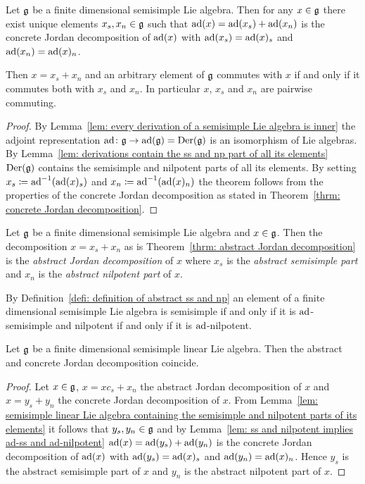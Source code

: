 \begin{thrm} \label{thrm: abstract Jordan decomposition}
 Let $\mathfrak{g}$ be a finite dimensional semisimple Lie algebra. Then for any $x \in \mathfrak{g}$ there exist unique elements $x_s, x_n \in \mathfrak{g}$ such that $\operatorname{ad}(x) = \operatorname{ad}(x_s) + \operatorname{ad}(x_n)$ is the concrete Jordan decomposition of $\operatorname{ad}(x)$ with $\operatorname{ad}(x_s) = \operatorname{ad}(x)_s$ and $\operatorname{ad}(x_n) = \operatorname{ad}(x)_n$.
 
 Then $x = x_s + x_n$ and an arbitrary element of $\mathfrak{g}$ commutes with $x$ if and only if it commutes both with $x_s$ and $x_n$. In particular $x$, $x_s$ and $x_n$ are pairwise commuting.
\end{thrm}
\begin{proof}
 By Lemma~\ref{lem: every derivation of a semisimple Lie algebra is inner} the adjoint representation $\operatorname{ad} \colon \mathfrak{g} \to \operatorname{ad}(\mathfrak{g}) = \operatorname{Der}(\mathfrak{g})$ is an isomorphism of Lie algebras. By Lemma~\ref{lem: derivations contain the ss and np part of all its elements} $\operatorname{Der}(\mathfrak{g})$ contains the semisimple and nilpotent parts of all its elements. By setting $x_s \coloneq \operatorname{ad}^{-1}(\operatorname{ad}(x)_s)$ and $x_n \coloneqq \operatorname{ad}^{-1}(\operatorname{ad}(x)_n)$ the theorem follows from the properties of the concrete Jordan decomposition as stated in Theorem~\ref{thrm: concrete Jordan decomposition}.
\end{proof}


\begin{defi}\label{defi: definition of abstract ss and np}
 Let $\mathfrak{g}$ be a finite dimensional semisimple Lie algebra and $x \in \mathfrak{g}$. Then the decomposition $x = x_s + x_n$ as is Theorem~\ref{thrm: abstract Jordan decomposition} is the \emph{abstract Jordan decomposition} of $x$ where $x_s$ is the \emph{abstract semisimple part} and $x_n$ is the \emph{abstract nilpotent part} of $x$.
\end{defi}


\begin{rem}
 By Definition~\ref{defi: definition of abstract ss and np} an element of a finite dimensional semisimple Lie algebra is semisimple if and only if it is $\operatorname{ad}$-semisimple and nilpotent if and only if it is $\operatorname{ad}$-nilpotent.
\end{rem}


\begin{prop}\label{prop: abstract and concrete Jordan decomposition coincide}
 Let $\mathfrak{g}$ be a finite dimensional semisimple linear Lie algebra. Then the abstract and concrete Jordan decomposition coincide.
\end{prop}
\begin{proof}
 Let $x \in \mathfrak{g}$, $x = xc_s + x_n$ the abstract Jordan decomposition of $x$ and $x = y_s + y_n$ the concrete Jordan decomposition of $x$. From Lemma~\ref{lem: semisimple linear Lie algebra containing the semisimple and nilpotent parts of its elements} it follows that $y_s, y_n \in \mathfrak{g}$ and by Lemma~\ref{lem: ss and nilpotent implies ad-ss and ad-nilpotent} $\operatorname{ad}(x) = \operatorname{ad}(y_s) + \operatorname{ad}(y_n)$ is the concrete Jordan decomposition of $\operatorname{ad}(x)$ with $\operatorname{ad}(y_s) = \operatorname{ad}(x)_s$ and $\operatorname{ad}(y_n) = \operatorname{ad}(x)_n$. Hence $y_s$ is the abstract semisimple part of $x$ and $y_n$ is the abstract nilpotent part of $x$.
\end{proof}


